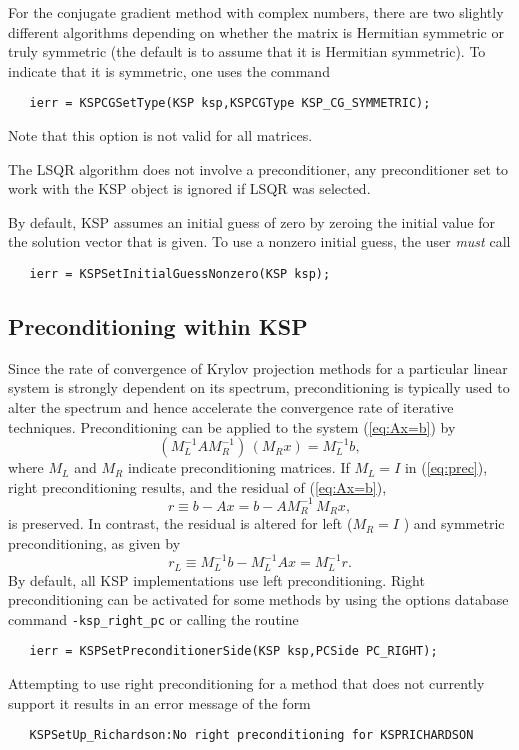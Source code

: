 For the conjugate gradient method with complex numbers, there are two
slightly different algorithms depending on whether the matrix is 
Hermitian symmetric or truly symmetric (the default is to assume that
it is Hermitian symmetric). To indicate that it is symmetric, one uses the command
  
\begin{verbatim}
   ierr = KSPCGSetType(KSP ksp,KSPCGType KSP_CG_SYMMETRIC);
\end{verbatim}
Note that this option is not valid for all matrices.

The LSQR algorithm does not involve a preconditioner, any preconditioner
set to work with the KSP object is ignored if LSQR was selected.

By default, KSP assumes an initial guess of zero by zeroing the initial 
value for the solution vector that is given. To use a nonzero 
initial guess, the user {\em must} call 
\begin{verbatim}
   ierr = KSPSetInitialGuessNonzero(KSP ksp);
\end{verbatim}

\subsection{Preconditioning within KSP} 
\label{sec:ksppc}

Since the rate of convergence of Krylov projection methods for a
particular linear system is strongly dependent on its spectrum,
preconditioning is typically used to alter the spectrum and hence
accelerate the convergence rate of iterative techniques.
Preconditioning can be applied to the system (\ref{eq:Ax=b}) by
\begin{equation}
   (M_L^{-1} A M_R^{-1}) \, (M_R x) = M_L^{-1} b,
\label{eq:prec}
\end{equation}
where $ M_L$ and $ M_R $ indicate preconditioning matrices.  If $ M_L = I $
in (\ref{eq:prec}), right preconditioning results, and the
residual of (\ref{eq:Ax=b}),
  \[ r \equiv b - Ax = b - A M_R^{-1} \, M_R x, \]
is preserved.  In contrast, the residual is altered for left 
($ M_R = I $ ) and symmetric preconditioning, as given by
  \[ r_L \equiv M_L^{-1} b - M_L^{-1} A x = M_L^{-1} r. \]
By default, all KSP implementations use left preconditioning.  
Right preconditioning can be activated for some methods by
using the options database command {\tt -ksp\_right\_pc} or
calling the routine  
\begin{verbatim}
   ierr = KSPSetPreconditionerSide(KSP ksp,PCSide PC_RIGHT);
\end{verbatim}
Attempting to use right preconditioning for a method that
does not currently support it results in an error message of the form
\begin{verbatim}
   KSPSetUp_Richardson:No right preconditioning for KSPRICHARDSON
\end{verbatim}

